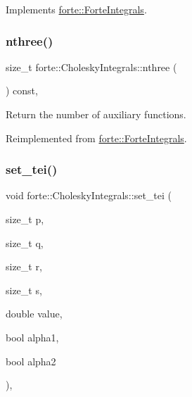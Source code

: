 Implements \mbox{\hyperlink{classforte_1_1_forte_integrals_a7862835fa0f5f9abe13dfcd6730fa4be}{forte\+::\+Forte\+Integrals}}.

\mbox{\label{classforte_1_1_cholesky_integrals_a595f615fb37218eb03e862fb993151fa}} 
\subsubsection{\texorpdfstring{nthree()}{nthree()}}
{\footnotesize\ttfamily size\+\_\+t forte\+::\+Cholesky\+Integrals\+::nthree (\begin{DoxyParamCaption}{ }\end{DoxyParamCaption}) const\hspace{0.3cm}{\ttfamily [override]}, {\ttfamily [virtual]}}



Return the number of auxiliary functions. 



Reimplemented from \mbox{\hyperlink{classforte_1_1_forte_integrals_af04858e7813556747745f90ffbda81a4}{forte\+::\+Forte\+Integrals}}.

\mbox{\label{classforte_1_1_cholesky_integrals_a1db39bcdf9fd78a15ca3d1448bd08c5f}} 
\subsubsection{\texorpdfstring{set\+\_\+tei()}{set\_tei()}}
{\footnotesize\ttfamily void forte\+::\+Cholesky\+Integrals\+::set\+\_\+tei (\begin{DoxyParamCaption}\item[{size\+\_\+t}]{p,  }\item[{size\+\_\+t}]{q,  }\item[{size\+\_\+t}]{r,  }\item[{size\+\_\+t}]{s,  }\item[{double}]{value,  }\item[{bool}]{alpha1,  }\item[{bool}]{alpha2 }\end{DoxyParamCaption})\hspace{0.3cm}{\ttfamily [override]}, {\ttfamily [virtual]}}



